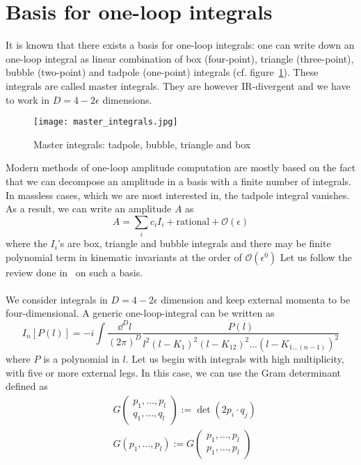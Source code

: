 \section{Basis for one-loop integrals} 
It is known that there exists a basis for one-loop integrals: one can write down an one-loop integral as linear combination of box (four-point), triangle (three-point), bubble (two-point) and tadpole (one-point) integrals (cf. figure~\ref{fig-mi}).
These integrals are called master integrals. 
They are however IR-divergent and we have to work in $D=4-2\epsilon$ dimensions.
\begin{figure}[h]
  \centering
  \texttt{[image: master\_integrals.jpg]}
  \caption{Master integrals: tadpole, bubble, triangle and box}
  \label{fig-mi}
\end{figure}
Modern methods of one-loop amplitude computation are mostly based on the fact that we can decompose an amplitude in a basis with a finite number of integrals.
In massless cases, which we are most interested in, the tadpole integral vanishes. 
As a result, we can write an amplitude $A$ as
\begin{equation}\label{master_equation}
A = \sum_i c_i I_i + \mathrm{rational} + \mathcal{O}(\epsilon)
\end{equation}
where the $I_i$'s are box, triangle and bubble integrals and there may be finite polynomial term in kinematic invariants at the order of $\mathcal{O}(\epsilon^0)$
Let us follow the review done in~\cite{Gluza:2010ws} on such a basis.
\\\\
We consider integrals in $D= 4-2\epsilon$ dimension and keep external momenta to be four-dimensional.
A generic one-loop-integral can be written as
\begin{equation}\label{generic_loop_int}
I_n[P(l)] = 
-i\int\frac{\dd^D l}{(2\pi)^D}\frac{P(l)}{l^2(l-K_1)^2(l-K_{12})^2\ldots(l-K_{1\ldots (n-1)})^2}
\end{equation}
where $P$ is a polynomial in $l$.
Let us begin with integrals with high multiplicity, with five or more external legs.
In this case, we can use the Gram determinant defined as
\begin{equation*}
\begin{split}
& G\begin{pmatrix}
p_1,\ldots, p_l \\
q_1,\ldots, q_l 
\end{pmatrix}
:= \det(2p_i\cdot q_j)
\\
& G(p_1, \ldots , p_l) := G\begin{pmatrix}
p_1,\ldots, p_l \\
p_1,\ldots, p_l 
\end{pmatrix}
\end{split}
\end{equation*} 
